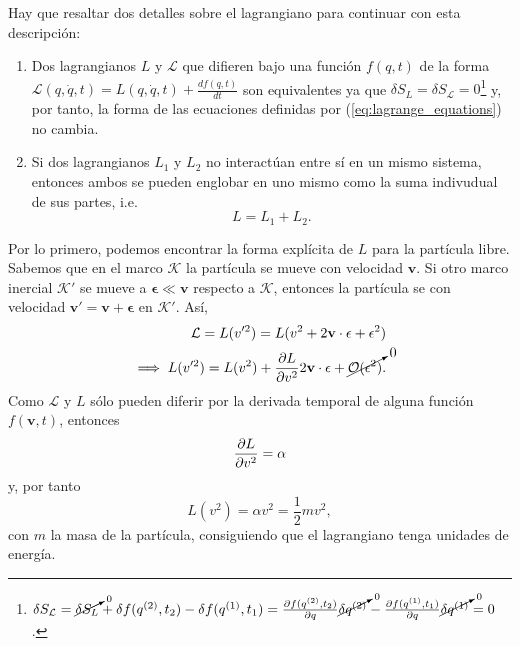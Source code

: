 Hay que resaltar dos detalles sobre el lagrangiano para continuar con esta descripción:
\begin{enumerate}

  \item Dos lagrangianos $L$ y $\mathcal{L}$ que difieren bajo una función $f(q,t)$ de la forma $\mathcal{L}(q,\dot{q},t) = L(q,\dot{q},t) + \frac{d f(q,t)}{dt}$ son equivalentes ya que $\delta S_{L} = \delta S_{\mathcal{L}} = 0$\footnote{$ \delta S_{\mathcal{L}} = \cancelto{0}{\delta S_L} + \delta f(q^{(2)},t_2) - \delta f(q^{(1)},t_1) = \frac{\partial f(q^{(2)},t_2)}{\partial q} \cancelto{0}{ \delta q^{(2)} } - \frac{\partial f(q^{(1)},t_1)}{\partial q} \cancelto{0}{ \delta q^{(1)} } = 0$.} y, por tanto, la forma de las ecuaciones definidas por (\ref{eq:lagrange_equations}) no cambia.

 \item Si dos lagrangianos $L_1$ y $L_2$ no interactúan entre sí en un mismo sistema, entonces ambos se pueden englobar en uno mismo como la suma indivudual de sus partes, i.e.
 \begin{equation}
  L = L_1 + L_2 .
  \label{eq:lagrangian_addititivy}
 \end{equation}
 
\end{enumerate}

Por lo primero, podemos encontrar la forma explícita de $L$ para la partícula libre. Sabemos que en el marco $\mathcal{K}$ la partícula se mueve con velocidad $\mathbf{v}$. Si otro marco inercial $\mathcal{K}'$ se mueve a $\mathbf{\epsilon} \ll \mathbf{v}$ respecto a $\mathcal{K}$, entonces la partícula se con velocidad $\mathbf{v}' = \mathbf{v} + \mathbf{\epsilon}$ en $\mathcal{K}'$. Así,
\begin{align*}
 \mathcal{L} = L(v'^2) = L(v^2 + 2 \mathbf{v} \cdot \mathbf{\epsilon} + \epsilon^2) \\
 \implies  L(v'^2) = L(v^2) + \frac{\partial L}{\partial v^2} 2 \mathbf{v} \cdot \mathbf{\epsilon} + \cancelto{0}{\mathcal{O}(\epsilon^2)}.
\end{align*}
Como $\mathcal{L}$ y $L$ sólo pueden diferir por la derivada temporal de alguna función $f(\mathbf{v},t)$, entonces
\begin{align*}
 \frac{\partial L}{\partial v^2} = \alpha
\end{align*}
y, por tanto
\begin{equation}
 L(v^2) = \alpha v^2 = \frac{1}{2}m v^2,
\end{equation}
con $m$ la masa de la partícula, consiguiendo que el lagrangiano tenga unidades de energía.

